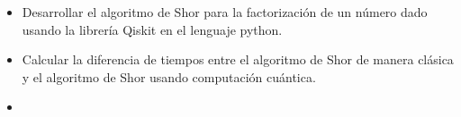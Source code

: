 \begin{itemize}
    \item Desarrollar el algoritmo de Shor para la factorización de un número dado usando la librería Qiskit en el lenguaje python.
    \item Calcular la diferencia de tiempos entre el algoritmo de Shor de manera clásica y el algoritmo de Shor usando computación cuántica.
    \item 
\end{itemize}